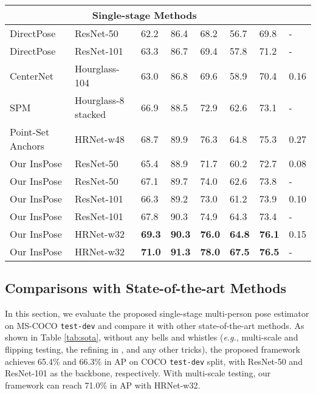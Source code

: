 \documentclass[sigconf]{acmart}
\begin{document}
\begin{table*}[ht]
\begin{tabular}{p{110 pt}<{\centering}p{110 pt}<{\centering}p{30 pt}<{\centering}p{30 pt}<{\centering}p{30 pt}<{\centering}p{30 pt}<{\centering}p{30 pt}<{\centering}p{30 pt}<{\centering}}
    \midrule
    \multicolumn{7}{c}{\textbf{Single-stage Methods}} \\
    \midrule
    DirectPose \cite{tian2019directpose} & ResNet-50 & 62.2 & 86.4 & 68.2 & 56.7 & 69.8 &-\\
DirectPose \cite{tian2019directpose} & ResNet-101 & 63.3 & 86.7 & 69.4 & 57.8 & 71.2 &-\\
CenterNet \cite{zhou2019objects} & Hourglass-104 & 63.0 & 86.8 & 69.6 & 58.9 & 70.4 & 0.16\\
    SPM \cite{nie2019single} & Hourglass-8 stacked & 66.9 & 88.5 & 72.9 & 62.6 & 73.1 &-\\
    Point-Set Anchors \cite{wei2020point} & HRNet-w48 & 68.7 & 89.9 & 76.3 & 64.8 & 75.3 & 0.27\\
Our InsPose & ResNet-50 & 65.4 & 88.9 & 71.7 & 60.2 & 72.7 & 0.08\\
    Our InsPose & ResNet-50 & 67.1 & 89.7 & 74.0 & 62.6 & 73.8 &-\\
    Our InsPose & ResNet-101 & 66.3 & 89.2 & 73.0 & 61.2 & 73.9 & 0.10\\
    Our InsPose & ResNet-101 & 67.8 & 90.3 & 74.9 & 64.3 & 73.4 &-\\
    Our InsPose & HRNet-w32 & \textbf{69.3} & \textbf{90.3} & \textbf{76.0} & \textbf{64.8} & \textbf{76.1} &  0.15\\
    Our InsPose &  HRNet-w32 &  \textbf{71.0} &  \textbf{91.3} &  \textbf{78.0} &  \textbf{67.5} & \textbf{76.5} & -\\
\bottomrule
\end{tabular}
\end{table*}


\subsection{Comparisons with State-of-the-art Methods}
In this section, we evaluate the proposed single-stage multi-person pose estimator on MS-COCO \texttt{test-dev} and compare it with other state-of-the-art methods. 
As shown in Table \ref{tab:sota},  without any bells and whistles (\textit{e.g.}, multi-scale and flipping testing, the refining in \cite{cao2017realtime, newell2016associative}, and any other tricks), the proposed framework achieves 65.4\% and 66.3\% in AP on COCO \texttt{test-dev} split, with ResNet-50 and ResNet-101 as the backbone, respectively. With multi-scale testing, our framework can reach 71.0\% in AP with HRNet-w32.
\end{document}
